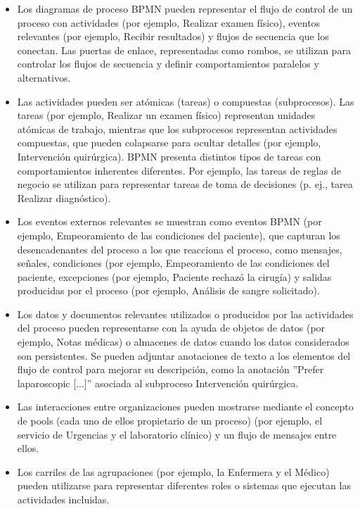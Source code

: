 \begin{itemize}
    \item Los diagramas de proceso BPMN pueden representar el flujo de control de un proceso con actividades (por ejemplo, Realizar examen físico), eventos relevantes (por ejemplo, Recibir resultados) y flujos de secuencia que los conectan. Las puertas de enlace, representadas como rombos, se utilizan para controlar los flujos de secuencia y definir comportamientos paralelos y alternativos.
    \item Las actividades pueden ser atómicas (tareas) o compuestas (subprocesos). Las tareas (por ejemplo, Realizar un examen físico) representan unidades atómicas de trabajo, mientras que los subprocesos representan actividades compuestas, que pueden colapsarse para ocultar detalles (por ejemplo, Intervención quirúrgica). BPMN presenta distintos tipos de tareas con comportamientos inherentes diferentes. Por ejemplo, las tareas de reglas de negocio se utilizan para representar tareas de toma de decisiones (p. ej., tarea Realizar diagnóstico).
    \item Los eventos externos relevantes se muestran como eventos BPMN (por ejemplo, Empeoramiento de las condiciones del paciente), que capturan los desencadenantes del proceso a los que reacciona el proceso, como mensajes, señales, condiciones (por ejemplo, Empeoramiento de las condiciones del paciente, excepciones (por ejemplo, Paciente rechazó la cirugía) y salidas producidas por el proceso (por ejemplo, Análisis de sangre solicitado).
    \item Los datos y documentos relevantes utilizados o producidos por las actividades del proceso pueden representarse con la ayuda de objetos de datos (por ejemplo, Notas médicas) o almacenes de datos cuando los datos considerados son persistentes. Se pueden adjuntar anotaciones de texto a los elementos del flujo de control para mejorar su descripción, como la anotación ''Prefer laparoscopic [...]'' asociada al subproceso Intervención quirúrgica.
    \item Las interacciones entre organizaciones pueden mostrarse mediante el concepto de pools (cada uno de ellos propietario de un proceso) (por ejemplo, el servicio de Urgencias y el laboratorio clínico) y un flujo de mensajes entre ellos.
    \item Los carriles de las agrupaciones (por ejemplo, la Enfermera y el Médico) pueden utilizarse para representar diferentes roles o sistemas que ejecutan las actividades incluidas.
\end{itemize}

